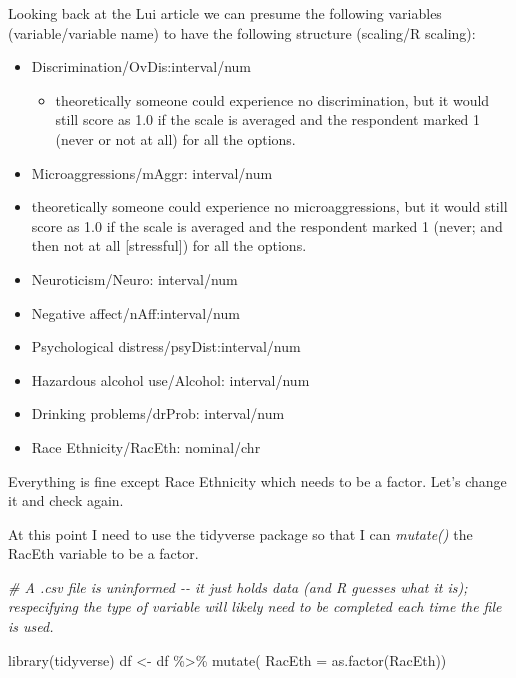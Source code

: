 \documentclass[
  english,
]{book}
\newenvironment{Shaded}{\begin{snugshade}}{\end{snugshade}}
\newcommand{\AttributeTok}[1]{\textcolor[rgb]{0.77,0.63,0.00}{#1}}
\newcommand{\CommentTok}[1]{\textcolor[rgb]{0.56,0.35,0.01}{\textit{#1}}}
\newcommand{\FunctionTok}[1]{\textcolor[rgb]{0.00,0.00,0.00}{#1}}
\newcommand{\NormalTok}[1]{#1}
\newcommand{\OtherTok}[1]{\textcolor[rgb]{0.56,0.35,0.01}{#1}}
\newcommand{\SpecialCharTok}[1]{\textcolor[rgb]{0.00,0.00,0.00}{#1}}
\providecommand{\tightlist}{%
  \setlength{\itemsep}{0pt}\setlength{\parskip}{0pt}}
\begin{document}
Looking back at the Lui \citeyearpar{lui_racial_2020} article we can presume the following variables (variable/variable name) to have the following structure (scaling/R scaling):

\begin{itemize}
\tightlist
\item
  Discrimination/OvDis:interval/num

  \begin{itemize}
  \tightlist
  \item
    theoretically someone could experience no discrimination, but it would still score as 1.0 if the scale is averaged and the respondent marked 1 (never or not at all) for all the options.
  \end{itemize}
\item
  Microaggressions/mAggr: interval/num
\item
  theoretically someone could experience no microaggressions, but it would still score as 1.0 if the scale is averaged and the respondent marked 1 (never; and then not at all {[}stressful{]}) for all the options.
\item
  Neuroticism/Neuro: interval/num
\item
  Negative affect/nAff:interval/num
\item
  Psychological distress/psyDist:interval/num
\item
  Hazardous alcohol use/Alcohol: interval/num
\item
  Drinking problems/drProb: interval/num
\item
  Race Ethnicity/RacEth: nominal/chr
\end{itemize}

Everything is fine except Race Ethnicity which needs to be a factor. Let's change it and check again.

At this point I need to use the tidyverse package so that I can \emph{mutate()} the RacEth variable to be a factor.

\begin{Shaded}
\begin{Highlighting}[]
\CommentTok{\# A .csv file is uninformed {-}{-} it just holds data (and R guesses what it is); respecifying the type of variable will likely need to be completed each time the file is used.}

\FunctionTok{library}\NormalTok{(tidyverse)}
\NormalTok{df }\OtherTok{\textless{}{-}}\NormalTok{ df }\SpecialCharTok{\%\textgreater{}\%}
    \FunctionTok{mutate}\NormalTok{(}
        \AttributeTok{RacEth =} \FunctionTok{as.factor}\NormalTok{(RacEth))}
\end{Highlighting}
\end{Shaded}
\end{document}
